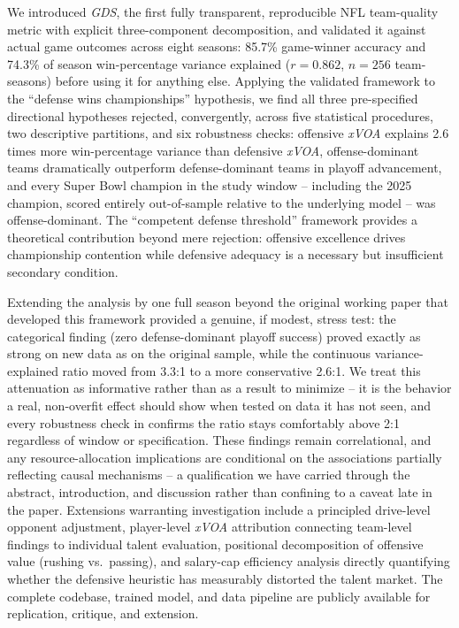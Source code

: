 \documentclass[12pt,a4paper]{article}
\newcommand{\xvoa}{\textit{xVOA}}
\newcommand{\gds}{\textit{GDS}}
\begin{document}
We introduced \gds{}, the first fully transparent, reproducible NFL team-quality metric with explicit three-component decomposition, and validated it against actual game outcomes across eight seasons: 85.7\% game-winner accuracy and 74.3\% of season win-percentage variance explained ($r=0.862$, $n=256$ team-seasons) before using it for anything else. Applying the validated framework to the ``defense wins championships'' hypothesis, we find all three pre-specified directional hypotheses rejected, convergently, across five statistical procedures, two descriptive partitions, and six robustness checks: offensive \xvoa{} explains 2.6 times more win-percentage variance than defensive \xvoa{}, offense-dominant teams dramatically outperform defense-dominant teams in playoff advancement, and every Super Bowl champion in the study window -- including the 2025 champion, scored entirely out-of-sample relative to the underlying model -- was offense-dominant. The ``competent defense threshold'' framework provides a theoretical contribution beyond mere rejection: offensive excellence drives championship contention while defensive adequacy is a necessary but insufficient secondary condition.

Extending the analysis by one full season beyond the original working paper that developed this framework provided a genuine, if modest, stress test: the categorical finding (zero defense-dominant playoff success) proved exactly as strong on new data as on the original sample, while the continuous variance-explained ratio moved from 3.3:1 to a more conservative 2.6:1. We treat this attenuation as informative rather than as a result to minimize -- it is the behavior a real, non-overfit effect should show when tested on data it has not seen, and every robustness check in  confirms the ratio stays comfortably above 2:1 regardless of window or specification. These findings remain correlational, and any resource-allocation implications are conditional on the associations partially reflecting causal mechanisms -- a qualification we have carried through the abstract, introduction, and discussion rather than confining to a caveat late in the paper. Extensions warranting investigation include a principled drive-level opponent adjustment, player-level \xvoa{} attribution connecting team-level findings to individual talent evaluation, positional decomposition of offensive value (rushing vs.\ passing), and salary-cap efficiency analysis directly quantifying whether the defensive heuristic has measurably distorted the talent market. The complete codebase, trained model, and data pipeline are publicly available for replication, critique, and extension.
\end{document}
